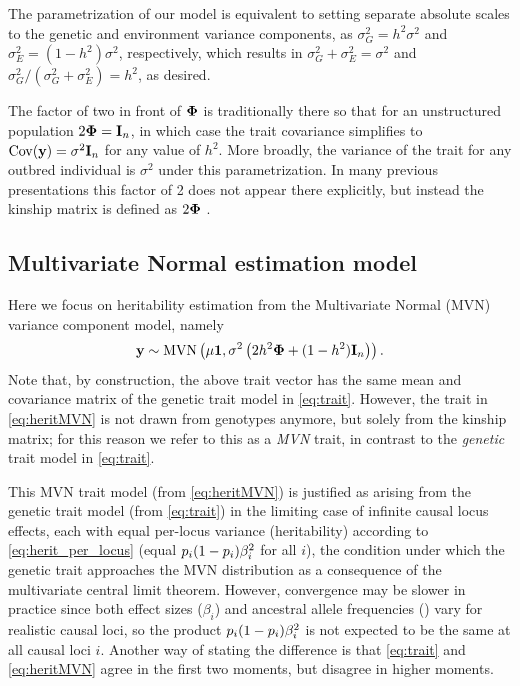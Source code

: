 \documentclass[11pt]{article}
\newcommand{\kinMat}{%
  \ensuremath{%
    \mathbf{\Phi}
  }%
  \xspace%
}%
\begin{document}
The parametrization of our model is equivalent to setting separate absolute scales to the genetic and environment variance components, as $\sigma^2_G = h^2 \sigma^2$ and $\sigma^2_E = (1-h^2) \sigma^2$, respectively, which results in $\sigma^2_G + \sigma^2_E = \sigma^2$ and $\sigma^2_G / (\sigma^2_G + \sigma^2_E) = h^2$, as desired.

The factor of two in front of $\kinMat$ is traditionally there so that for an unstructured population
$2 \kinMat = \mathbf{I}_n$, in which case the trait covariance simplifies to
$\operatorname{Cov}(\mathbf{y}) = \sigma^2 \mathbf{I}_n$ for any value of $h^2$.
More broadly, the variance of the trait for any outbred individual is $\sigma^2$ under this parametrization.
In many previous presentations this factor of 2 does not appear there explicitly, but instead the kinship matrix is defined as $2 \kinMat$ \citep{yang_gcta:_2011, speed_improved_2012}.

\subsection{Multivariate Normal estimation model}

Here we focus on heritability estimation from the Multivariate Normal (MVN) variance component model, namely \citep{speed_improved_2012, yang_gcta:_2011}
\begin{equation}
  \label{eq:heritMVN}
  \mathbf{y}
  \sim
  \text{MVN}
  \left(
    \mu \mathbf{1},
    \sigma^2 \left(
      2 h^2 \kinMat
      + (1-h^2) \mathbf{I}_n
      \right)
  \right)
  .
\end{equation}
Note that, by construction, the above trait vector has the same mean and covariance matrix of the genetic trait model in \cref{eq:trait}.
However, the trait in \cref{eq:heritMVN} is not drawn from genotypes anymore, but solely from the kinship matrix; for this reason we refer to this as a \textit{MVN} trait, in contrast to the \textit{genetic} trait model in \cref{eq:trait}.

This MVN trait model (from \cref{eq:heritMVN}) is justified as arising from the genetic trait model (from \cref{eq:trait}) in the limiting case of infinite causal locus effects, each with equal per-locus variance (heritability) according to \cref{eq:herit_per_locus} (equal $ p_i   (1- p_i  ) \beta_i^2$ for all $i$), the condition under which the genetic trait approaches the MVN distribution as a consequence of the multivariate central limit theorem.
However, convergence may be slower in practice since both effect sizes ($\beta_i$) and ancestral allele frequencies (\pit) vary for realistic causal loci, so the product $ p_i   (1- p_i  ) \beta_i^2$ is not expected to be the same at all causal loci $i$.
Another way of stating the difference is that \cref{eq:trait} and \cref{eq:heritMVN} agree in the first two moments, but disagree in higher moments.
\end{document}
